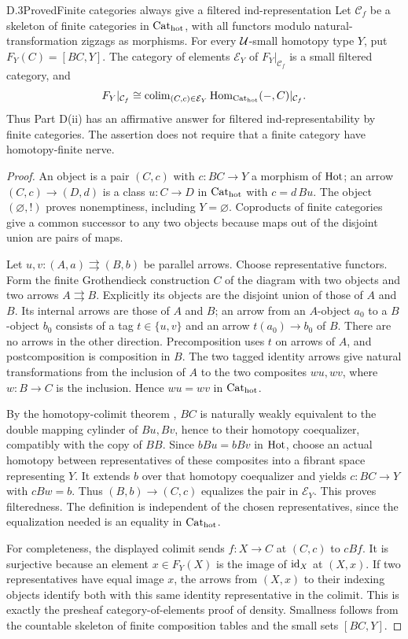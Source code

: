 \begin{claim}{D.3}{Proved}{Finite categories always give a filtered ind-representation}
Let $\mathcal C_f$ be a skeleton of finite categories in ${\mathrm{Cat}_{\mathrm{hot}}}$, with all functors modulo natural-transformation zigzags as morphisms. For every $\mathcal U$-small homotopy type $Y$, put $F_Y(C)=[BC,Y]$. The category of elements $\mathcal E_Y$ of $F_Y|_{\mathcal C_f}$ is a small filtered category, and
\[
 F_Y|_{\mathcal C_f}\cong
 \operatorname{colim}_{(C,c)\in\mathcal E_Y}\operatorname{Hom}_{{\mathrm{Cat}_{\mathrm{hot}}}}(-,C)|_{\mathcal C_f}.
\]
Thus Part D(ii) has an affirmative answer for filtered ind-representability by finite categories. The assertion does not require that a finite category have homotopy-finite nerve.
\end{claim}
\begin{proof}
An object is a pair $(C,c)$ with $c:BC\to Y$ a morphism of $\mathrm{Hot}$; an arrow $(C,c)\to(D,d)$ is a class $u:C\to D$ in ${\mathrm{Cat}_{\mathrm{hot}}}$ with $c=d\,Bu$. The object $(\varnothing,!)$ proves nonemptiness, including $Y=\varnothing$. Coproducts of finite categories give a common successor to any two objects because maps out of the disjoint union are pairs of maps.

Let $u,v:(A,a)\rightrightarrows(B,b)$ be parallel arrows. Choose representative functors. Form the finite Grothendieck construction $C$ of the diagram with two objects and two arrows $A\rightrightarrows B$. Explicitly its objects are the disjoint union of those of $A$ and $B$. Its internal arrows are those of $A$ and $B$; an arrow from an $A$-object $a_0$ to a $B$-object $b_0$ consists of a tag $t\in\{u,v\}$ and an arrow $t(a_0)\to b_0$ of $B$. There are no arrows in the other direction. Precomposition uses $t$ on arrows of $A$, and postcomposition is composition in $B$. The two tagged identity arrows give natural transformations from the inclusion of $A$ to the two composites $wu,wv$, where $w:B\to C$ is the inclusion. Hence $wu=wv$ in ${\mathrm{Cat}_{\mathrm{hot}}}$.

By the homotopy-colimit theorem \citep[Theorem~26.8 and Corollary~26.9]{ChacholskiScherer2001}, $BC$ is naturally weakly equivalent to the double mapping cylinder of $Bu,Bv$, hence to their homotopy coequalizer, compatibly with the copy of $BB$. Since $bBu=bBv$ in $\mathrm{Hot}$, choose an actual homotopy between representatives of these composites into a fibrant space representing $Y$. It extends $b$ over that homotopy coequalizer and yields $c:BC\to Y$ with $cBw=b$. Thus $(B,b)\to(C,c)$ equalizes the pair in $\mathcal E_Y$. This proves filteredness. The definition is independent of the chosen representatives, since the equalization needed is an equality in ${\mathrm{Cat}_{\mathrm{hot}}}$.

For completeness, the displayed colimit sends $f:X\to C$ at $(C,c)$ to $cBf$. It is surjective because an element $x\in F_Y(X)$ is the image of $\mathrm{id}_X$ at $(X,x)$. If two representatives have equal image $x$, the arrows from $(X,x)$ to their indexing objects identify both with this same identity representative in the colimit. This is exactly the presheaf category-of-elements proof of density. Smallness follows from the countable skeleton of finite composition tables and the small sets $[BC,Y]$.
\end{proof}

